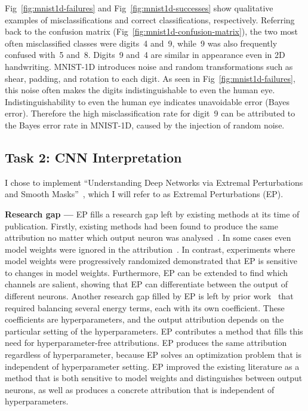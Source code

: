 \documentclass{article}
\newcommand{\myparagraph}[1]{\noindent\textbf{#1 ---}}
\begin{document}
Fig~\ref{fig:mnist1d-failures} and Fig~\ref{fig:mnist1d-successes} show qualitative examples of misclassifications and correct classifications, respectively.
Referring back to the confusion matrix (Fig~\ref{fig:mnist1d-confusion-matrix}), the two most often misclassified classes were digits~\num{4} and~\num{9}, while~\num{9} was also frequently confused with~\num{5} and~\num{8}.
Digits~\num{9} and~\num{4} are similar in appearance even in 2D handwriting.
MNIST-1D introduces noise and random transformations such as shear, padding, and rotation to each digit.
As seen in Fig~\ref{fig:mnist1d-failures}, this noise often makes the digits indistinguishable to even the human eye.
Indistinguishability to even the human eye indicates unavoidable error (Bayes error).
Therefore the high misclassification rate for digit~\num{9} can be attributed to the Bayes error rate in MNIST-1D, caused by the injection of random noise.


\subsection{Task 2: CNN Interpretation}


I chose to implement ``Understanding Deep Networks via Extremal Perturbations and Smooth Masks''~\cite{fong2019understanding}, which I will refer to as Extremal Perturbations (EP).

\myparagraph{Research gap} EP fills a research gap left by existing methods at its time of publication.
Firstly, existing methods had been found to produce the same attribution no matter which output neuron was analysed~\cite{mahendran2016salient}.
In some cases even model weights were ignored in the attribution~\cite{adebayo2018sanity}.
In contrast, experiments where model weights were progressively randomized demonstrated that EP is sensitive to changes in model weights.
Furthermore, EP can be extended to find which channels are salient, showing that EP can differentiate between the output of different neurons.
Another research gap filled by EP is left by prior work~\cite{fong2017interpretable} that required balancing several energy terms, each with its own coefficient.
These coefficients are hyperparameters, and the output attribution depends on the particular setting of the hyperparameters.
EP contributes a method that fills this need for hyperparameter-free attributions.
EP produces the same attribution regardless of hyperparameter, because EP solves an optimization problem that is independent of hyperparameter setting.
EP improved the existing literature as a method that is both sensitive to model weights and distinguishes between output neurons, as well as produces a concrete attribution that is independent of hyperparameters.
\end{document}
